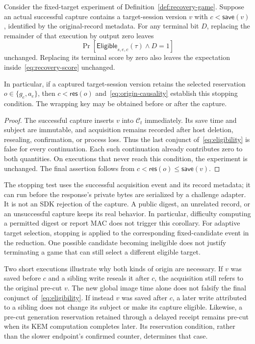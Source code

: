 \begin{corollary}
\label{cor:target-acquisition-stop}
Consider the fixed-target experiment of
Definition~\ref{def:recovery-game}.  Suppose an actual successful capture
contains a target-session version $v$ with $c<\mathsf{save}(v)$, identified
by the original-record metadata.  For any terminal bit $D$, replacing the
remainder of that execution by output zero leaves
\[
   \Pr[\mathsf{Eligible}_{s,e,c}(\tau)\wedge D=1]
\]
unchanged.  Replacing its terminal score by zero also leaves the expectation
inside~\eqref{eq:recovery-score} unchanged.

In particular, if a captured target-session version retains the selected
reservation $o\in\{g_e,a_e\}$, then
$c<\mathsf{res}(o)$ and~\eqref{eq:origin-causality} establish this stopping
condition.  The wrapping key may be obtained before or after the capture.
\end{corollary}

\begin{proof}
The successful capture inserts $v$ into $\mathcal C_t$ immediately.
Its save time and subject are immutable, and acquisition remains recorded
after host deletion, resealing, confirmation, or process loss.  Thus the
last conjunct of~\eqref{eq:eligibility} is false for every continuation.
Each such continuation already contributes zero to both quantities.
On executions that never reach this condition, the experiment is unchanged.
The final assertion follows from
$c<\mathsf{res}(o)\leq\mathsf{save}(v)$.
\end{proof}

The stopping test uses the successful acquisition event and its record
metadata; it can run before the response's private bytes are serialized by
a challenge adapter.  It is not an SDK rejection of the capture.  A public
digest, an unrelated record, or an unsuccessful capture keeps its real
behavior.  In particular, difficulty computing a permitted digest or report
MAC does not trigger this corollary.
For adaptive target selection, stopping is applied to the corresponding
fixed-candidate event in the reduction.  One possible candidate becoming
ineligible does not justify terminating a game that can still select a
different eligible target.

Two short executions illustrate why both kinds of origin are necessary.
If $v$ was saved before $c$ and a sibling write reseals it after $c$, the
acquisition still refers to the original pre-cut $v$.  The new global image
time alone does not falsify the final conjunct of~\eqref{eq:eligibility}.
If instead $v$ was saved after $c$, a later write attributed to a sibling
does not change its subject or make its capture eligible.  Likewise, a
pre-cut generation reservation retained through a delayed receipt remains
pre-cut when its KEM computation completes later.  Its reservation condition,
rather than the slower endpoint's confirmed counter, determines that case.

